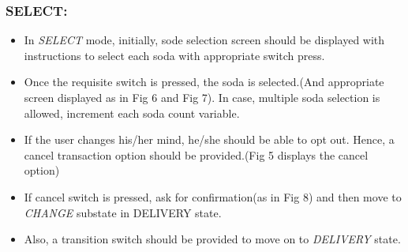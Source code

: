 \documentclass{article}
\begin{document}
\subsubsection{SELECT:}
\begin{itemize}
    \item In \textit{SELECT} mode, initially, sode selection screen should be displayed with instructions to select each soda with appropriate switch press.  
    \item Once the requisite switch is pressed, the soda is selected.(And appropriate screen displayed as in Fig 6 and Fig 7). In case, multiple soda selection is allowed, increment each soda count variable.
    \item If the user changes his/her mind, he/she should be able to opt out. Hence, a cancel transaction option should be provided.(Fig 5 displays the cancel option)
    \item If cancel switch is pressed, ask for confirmation(as in Fig 8) and then move to \textit{CHANGE} substate in DELIVERY state. 
    \item Also, a transition switch should be provided to move on to \textit{DELIVERY} state.
\end{itemize}
\end{document}
